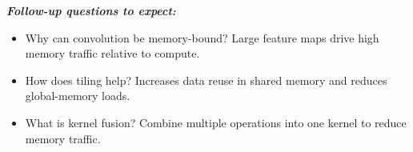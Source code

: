 \documentclass[12pt]{article}
\let\origtextbf\textbf
\renewcommand{\textbf}[1]{\origtextbf{\textit{#1}}}
\begin{document}
\textbf{Follow-up questions to expect:}
\begin{itemize}
\item Why can convolution be memory-bound? Large feature maps drive high memory traffic relative to compute.
\item How does tiling help? Increases data reuse in shared memory and reduces global-memory loads.
\item What is kernel fusion? Combine multiple operations into one kernel to reduce memory traffic.
\end{itemize}
\end{document}
